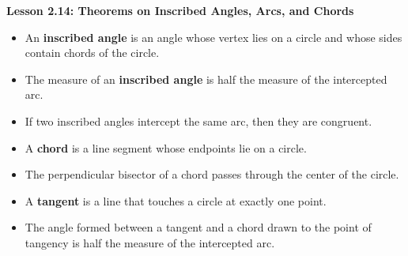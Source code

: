 \begin{center}
\textbf{Lesson 2.14: Theorems on Inscribed Angles, Arcs, and Chords}
\end{center}

\vspace*{-1.5ex}

\begin{itemize}
    \item An \textbf{inscribed angle} is an angle whose vertex lies on a circle and whose sides contain chords of the circle.
    \item The measure of an \textbf{inscribed angle} is half the measure of the intercepted arc.
    \item If two inscribed angles intercept the same arc, then they are congruent.
    \item A \textbf{chord} is a line segment whose endpoints lie on a circle.
    \item The perpendicular bisector of a chord passes through the center of the circle.
    \item A \textbf{tangent} is a line that touches a circle at exactly one point.
    \item The angle formed between a tangent and a chord drawn to the point of tangency is half the measure of the intercepted arc.
\end{itemize}
